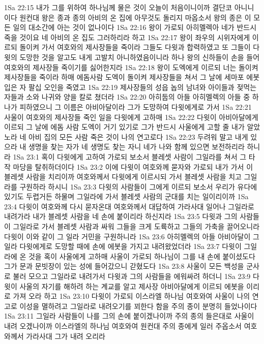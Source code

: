 1Sa 22:15  내가 그를 위하여 하나님께 물은 것이 오늘이 처음이니이까 결단코 아니니이다 원컨대 왕은 종과 종의 아비의 온 집에 아무것도 돌리지 마옵소서 왕의 종은 이 모든 일의 대소간에 아는 것이 없나이다
1Sa 22:16  왕이 가로되 아히멜렉아 네가 반드시 죽을 것이요 네 아비의 온 집도 그러하리라 하고
1Sa 22:17  왕이 좌우의 시위자에게 이르되 돌이켜 가서 여호와의 제사장들을 죽이라 그들도 다윗과 합력하였고 또 그들이 다윗의 도망한 것을 알고도 내게 고발치 아니하였음이니라 하나 왕의 신하들이 손을 들어 여호와의 제사장들 죽이기를 싫어한지라
1Sa 22:18  왕이 도엑에게 이르되 너는 돌이켜 제사장들을 죽이라 하매 에돔사람 도엑이 돌이켜 제사장들을 쳐서 그 날에 세마포 에봇 입은 자 팔십 오인을 죽였고
1Sa 22:19  제사장들의 성읍 놉의 남녀와 아이들과 젖먹는 자들과 소와 나귀와 양을 칼로 쳤더라
1Sa 22:20  아히둡의 아들 아히멜렉의 아들 중 하나가 피하였으니 그 이름은 아비아달이라 그가 도망하여 다윗에게로 가서
1Sa 22:21  사울이 여호와의 제사장들 죽인 일을 다윗에게 고하매
1Sa 22:22  다윗이 아비아달에게 이르되 그 날에 에돔 사람 도엑이 거기 있기로 그가 반드시 사울에게 고할 줄 내가 알았노라 네 아비 집의 모든 사람 죽은 것이 나의 연고로다
1Sa 22:23  두려워 말고 내게 있으라 내 생명을 찾는 자가 네 생명도 찾는 자니 네가 나와 함께 있으면 보전하리라 하니라
1Sa 23:1  혹이 다윗에게 고하여 가로되 보소서 블레셋 사람이 그일라를 쳐서 그 타작 마당을 탈취하더이다
1Sa 23:2  이에 다윗이 여호와께 묻자와 가로되 내가 가서 이 블레셋 사람을 치리이까 여호와께서 다윗에게 이르시되 가서 블레셋 사람을 치고 그일라를 구원하라 하시니
1Sa 23:3  다윗의 사람들이 그에게 이르되 보소서 우리가 유다에 있기도 두렵거든 하물며 그일라에 가서 블레셋 사람의 군대를 치는 일이리이까
1Sa 23:4  다윗이 여호와께 다시 묻자온대 여호와께서 대답하여 가라사대 일어나 그일라로 내려가라 내가 블레셋 사람을 네 손에 붙이리라 하신지라
1Sa 23:5  다윗과 그의 사람들이 그일라로 가서 블레셋 사람과 싸워 그들을 크게 도륙하고 그들의 가축을 끌어오니라 다윗이 이와 같이 그 일라 거민을 구원하니라
1Sa 23:6  아히멜렉의 아들 아비아달이 그일라 다윗에게로 도망할 때에 손에 에봇을 가지고 내려왔었더라
1Sa 23:7  다윗이 그일라에 온 것을 혹이 사울에게 고하매 사울이 가로되 하나님이 그를 내 손에 붙이셨도다 그가 문과 문빗장이 있는 성에 들어갔으니 갇혔도다
1Sa 23:8  사울이 모든 백성을 군사로 불러 모으고 그일라로 내려가서 다윗과 그의 사람들을 에워싸려 하더니
1Sa 23:9  다윗이 사울의 자기를 해하려 하는 계교를 알고 제사장 아비아달에게 이르되 에봇을 이리로 가져 오라 하고
1Sa 23:10  다윗이 가로되 이스라엘 하나님 여호와여 사울이 나의 연고로 이성을 멸하려고 그일라로 내려오기를 꾀한다 함을 주의 종이 분명히 들었나이다
1Sa 23:11  그일라 사람들이 나를 그의 손에 붙이겠나이까 주의 종의 들은대로 사울이 내려 오겠나이까 이스라엘의 하나님 여호와여 원컨대 주의 종에게 일러 주옵소서 여호와께서 가라사대 그가 내려 오리라
